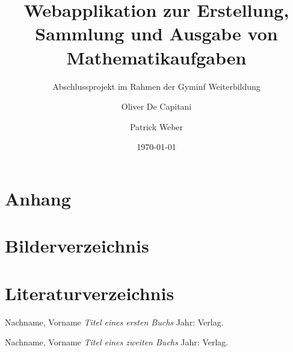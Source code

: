 \documentclass[12pt,a4paper]{scrartcl} %
\title{Webapplikation zur Erstellung, Sammlung und Ausgabe von Mathematikaufgaben}
\subtitle{Abschlussprojekt im Rahmen der Gyminf Weiterbildung}
\date{\today}
\author{Oliver De Capitani \and Patrick Weber}
\begin{document}
\maketitle %
% 



\newpage %
\tableofcontents %

\newpage


\newpage

 

 \newpage

 


\newpage



% 




\newpage



\newpage
   
  
\appendix
\section{Anhang}
\newpage





\section{Bilderverzeichnis}
\listoffigures



\newpage
\section{Literaturverzeichnis}

\begin{thebibliography}{1} %


 Nachname, Vorname {\em Titel eines ersten Buchs} Jahr: Verlag.

 Nachname, Vorname {\em Titel eines zweiten Buchs} Jahr: Verlag.



\end{thebibliography}
\end{document}
